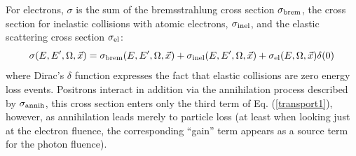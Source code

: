 For electrons, $\sigma$ is the sum of the 
bremsstrahlung cross section $\sigma_{\rm brem}$, the cross section 
for inelastic collisions with atomic electrons, $\sigma_{\rm inel}$, 
and the elastic scattering cross section $\sigma_{\rm el}$:
\begin{equation}
\sigma(E,E',\Omega,\vec{x}) = \sigma_{\rm brem}(E,E',\Omega,\vec{x}) 
+ \sigma_{\rm inel}(E,E',\Omega,\vec{x}) + 
\sigma_{\rm el}(E,\Omega,\vec{x}) \delta(0)
\end{equation}
where Dirac's $\delta$ function expresses the fact that 
elastic collisions are zero energy loss events. Positrons
interact in addition via the annihilation process described 
by $\sigma_{\rm annih}$, this cross section enters 
only the third term of Eq. (\ref{transport1}), however, as annihilation 
leads merely to particle loss  (at least when looking just at 
the electron fluence, the corresponding ``gain'' term appears 
as a source term for the photon fluence). 

